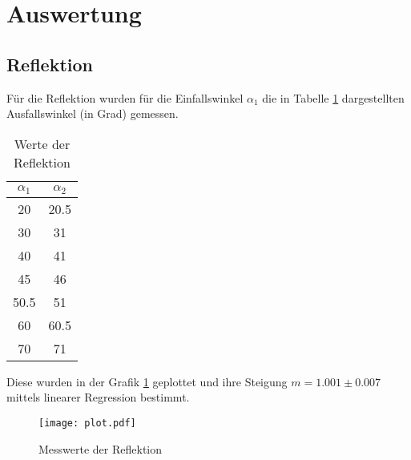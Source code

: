 \section{Auswertung}
\label{sec:Auswertung}

\subsection{Reflektion}
  Für die Reflektion wurden für die Einfallswinkel $\alpha_1$ die in Tabelle \ref{tab:angle} dargestellten Ausfallswinkel (in Grad)
  gemessen.
  \begin{table}[H]
    \centering
    \caption{Werte der Reflektion}
    \begin{tabular}{c c}
      \toprule
      $\alpha_1$ & $\alpha_2$\\
      \midrule
        20 & 20.5\\
        30 & 31\\
        40 & 41\\
        45 & 46\\
        50.5 & 51\\
        60 & 60.5\\
        70 & 71\\
      \bottomrule
    \end{tabular}
    \label{tab:angle}
  \end{table}
  \noindent Diese wurden in der Grafik \ref{fig:plot2} geplottet und ihre Steigung $m=1.001 \pm 0.007$
  mittels linearer Regression bestimmt.
  \begin{figure}[H]
    \centering
    \texttt{[image: plot.pdf]}
    \caption{Messwerte der Reflektion}
    \label{fig:plot2}
  \end{figure}

